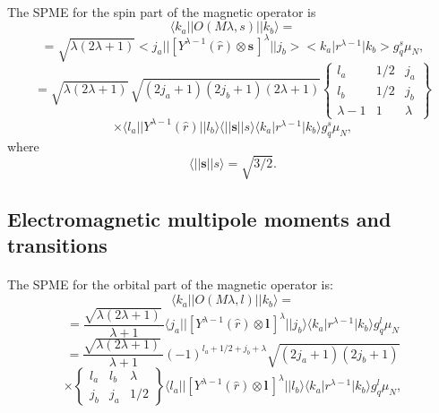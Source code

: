 \documentclass[%
oneside,                 %
final,                   %
10pt]{article}
\begin{document}
\paragraph{}
The SPME for the spin part of the magnetic operator is
\[
\langle k_{a}\vert\vert O(M\lambda ,s)\vert\vert k_{b}\rangle =
\]
\[
=\sqrt{\lambda (2\lambda +1)}<j_{a}\vert\vert [Y^{\lambda -1}(\hat{r})\otimes\mathbf{s}\,]^{\lambda }\vert\vert j_{b}><k_{a}\vert r^{\lambda -1}\vert k_{b}>g^{s}_{q}\mu _{N},
\]
\[
= \sqrt{\lambda (2\lambda +1)}\, \sqrt{(2j_{a}+1)(2j_{b}+1)(2\lambda +1)}\left\{\begin{array}{ccc}  {l _{a}}&  {1/2} & {j_{a}}\\  {l _{b}}&  {1/2} & {j_{b}}\\  {\lambda -1} & {1} & {\lambda}\end{array}\right\}
\]
\[
\times \langle l _{a}\vert\vert Y^{\lambda -1}(\hat{r})\vert\vert l _{b}\rangle\langle\vert\vert \mathbf{s}\vert\vert s\rangle\langle k_{a}\vert r^{\lambda -1}\vert k_{b}\rangle g^{s}_{q}\mu _{N},
\]
where
\[
\langle\vert\vert \mathbf{s}\vert\vert s\rangle = \sqrt{3/2}.
\]



\subsection{Electromagnetic multipole moments and transitions}

\paragraph{}
The SPME for the orbital part of the magnetic operator is:
\[
\langle k_{a}\vert\vert O(M\lambda ,l )\vert\vert k_{b}\rangle=
\]
\[
= \frac{\sqrt{\lambda (2\lambda +1)}\, }{\lambda +1}
\langle j_{a}\vert\vert [Y^{\lambda -1}(\hat{r})\otimes\mathbf{l}\,]^{\lambda }\vert\vert j_{b}\rangle
\langle k_{a}\vert r^{\lambda -1}\vert k_{b}\rangle g^{l }_{q}\mu _{N}
\]
\[
=\frac{\sqrt{\lambda (2\lambda +1)}\, }{\lambda +1}(-1)^{l _{a}+1/2+j_{b}+\lambda } \sqrt{(2j_{a}+1)(2j_{b}+1)}
\]
\[
\times\left\{\begin{array}{ccc}  {l _{a}} &  {l _{b}} & {\lambda} \\  {j_{b}}&  {j_{a}}&  {1/2}\end{array}\right\}
\langle l _{a}\vert\vert [Y^{\lambda -1}(\hat{r})\otimes\mathbf{l}\,]^{\lambda }\vert\vert l _{b}\rangle
\langle k_{a}\vert r^{\lambda -1}\vert k_{b}\rangle g^{l }_{q}\mu _{N}, 
\]
\end{document}
